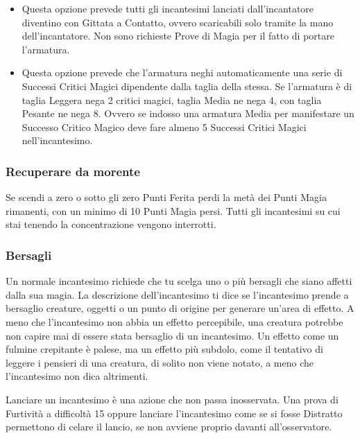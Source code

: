 \begin{multicols}{2}
\begin{itemize}[leftmargin=*] \setlength{\itemsep}{0pt}
	\item Questa opzione prevede tutti gli incantesimi lanciati dall'incantatore diventino con Gittata a Contatto, ovvero scaricabili solo tramite la mano dell'incantatore. Non sono richieste Prove di Magia per il fatto di portare l'armatura.
	\item Questa opzione prevede che l'armatura neghi automaticamente una serie di Successi Critici Magici dipendente dalla taglia della stessa. Se l'armatura è di taglia Leggera nega 2 critici magici, taglia Media ne nega 4, con taglia Pesante ne nega 8. Ovvero se indosso una armatura Media per manifestare un Successo Critico Magico deve fare almeno 5 Successi Critici Magici nell'incantesimo.
\end{itemize}


\subsubsection{Recuperare da morente}\label{magieessereucciso}

Se scendi a zero o sotto gli zero Punti Ferita perdi la metà dei Punti Magia rimanenti, con un minimo di 10 Punti Magia persi. Tutti gli incantesimi su cui stai tenendo la concentrazione vengono interrotti.

\subsubsection{Bersagli}\label{magiebersagli}

Un normale incantesimo richiede che tu scelga uno o più bersagli che siano affetti dalla sua magia. La descrizione dell'incantesimo ti dice se l'incantesimo prende a bersaglio creature, oggetti o un punto di origine per generare un'area di effetto. A meno che l'incantesimo non abbia un effetto percepibile, una creatura potrebbe non capire mai di essere stata bersaglio di un incantesimo. Un effetto come un fulmine crepitante è palese, ma un effetto più subdolo, come il tentativo di leggere i pensieri di una creatura, di solito non viene notato, a meno che l'incantesimo non dica altrimenti.

Lanciare un incantesimo è una azione che non passa inosservata. Una prova di Furtività a difficoltà 15 oppure lanciare l'incantesimo come se si fosse Distratto permettono di celare il lancio, se non avviene proprio davanti all'osservatore.


\end{multicols}
